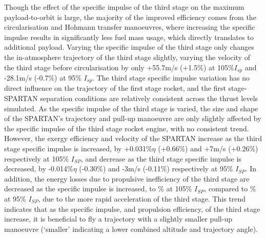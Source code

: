 Though the effect of the specific impulse of the third stage on the maximum payload-to-orbit is large, the majority of the improved efficiency comes from the circularisation and Hohmann transfer manoeuvres, where increasing the specific impulse results in significantly less fuel mass usage, which directly translates to additional payload. Varying the specific impulse of the third stage only changes the in-atmosphere trajectory of the third stage slightly, varying the velocity of the third stage before circularisation by only +55.7m/s (+1.5\%) at 105\%$I_{sp}$ and -28.1m/s (-0.7\%) at 95\% $I_{sp}$. 
The third stage specific impulse variation has no direct influence on the trajectory of the first stage rocket, and the first stage-SPARTAN separation conditions are relatively consistent across the thrust levels simulated.
As the specific impulse of the third stage is varied, the size and shape of the SPARTAN's trajectory and pull-up manoeuvre are only slightly affected by the specific impulse of the third stage rocket engine, with no consistent trend. 
 However, the exergy efficiency and velocity of the SPARTAN increase as the third stage specific impulse is increased, by +0.031\%$\eta$ (+0.66\%) and +7m/s (+0.26\%) respectively at 105\% $I_{SP}$, and decrease as the third stage specific impulse is decreased, by -0.014\%$\eta$ (-0.30\%) and -3m/s (-0.11\%) respectively at 95\% $I_{SP}$. 
 In addition, the energy losses due to propulsive inefficiency of the third stage are decreased as the specific impulse is increased, to \PlossthreeCombinedTThreeOneHundredTenNoReturn\% at 105\% $I_{SP}$, compared to \PlossthreeCombinedTThreeNinetyNoReturn\% at 95\% $I_{SP}$, due to the more rapid acceleration of the third stage.
 This trend indicates that as the specific impulse, and propulsion efficiency, of the third stage increase, it is beneficial to fly a trajectory with a slightly smaller pull-up manoeuvre (`smaller' indicating a lower combined altitude and trajectory angle).



